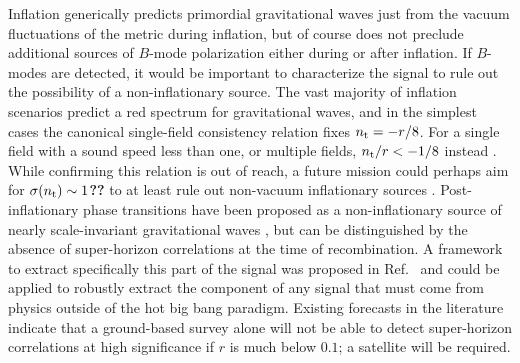 Inflation generically predicts primordial gravitational waves just from the vacuum fluctuations of the metric during inflation, but of course does not preclude additional sources of $B$-mode polarization either during or after inflation. If $B$-modes are detected, it would be important to characterize the signal to rule out the possibility of a non-inflationary source. 
The vast majority of inflation scenarios predict a red spectrum for gravitational waves, and in the simplest cases the canonical single-field consistency relation fixes $n_{\rm t}=-r/8$. For a single field with a sound speed less than one, or multiple fields, $n_{\rm t}/r<-1/8$ instead \cite{Price:2014ufa}. While confirming this relation is out of reach, a future mission could perhaps aim for $\sigma(n_{\rm t})\sim1${\bf ??} to at least rule out non-vacuum inflationary sources  \cite{Namba:2015gja,Peloso:2016gqs}. Post-inflationary phase transitions have been proposed as a non-inflationary source of nearly scale-invariant gravitational waves \cite{Krauss:1991qu,JonesSmith:2007ne,Giblin:2011yh,Figueroa:2012kw,Fenu:2013tea}, but can be distinguished by the absence of super-horizon correlations at the time of recombination. A framework to extract specifically this part of the signal was proposed in Ref.~\cite{Baumann:2009mq} and could be applied to robustly extract the component of any signal that must come from physics outside of the hot big bang paradigm. Existing forecasts in the literature \cite{Lee:2014cya} indicate that a ground-based survey alone will not be able to detect super-horizon correlations at high significance if $r$ is much below $0.1$; a satellite will be required.

